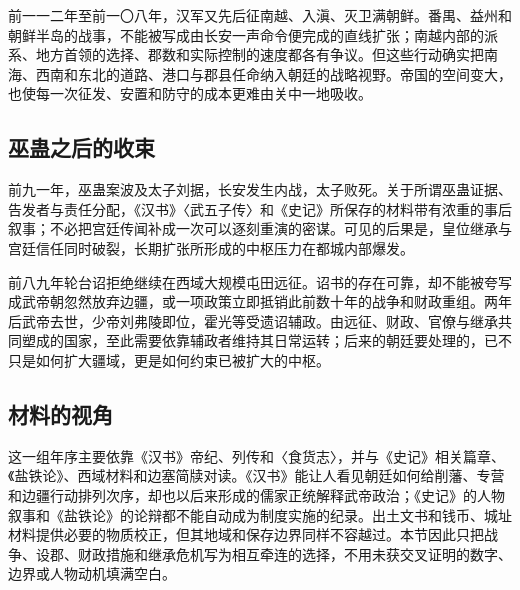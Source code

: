 前一一二年至前一〇八年，汉军又先后征南越、入滇、灭卫满朝鲜。番禺、益州和朝鲜半岛的战事，不能被写成由长安一声命令便完成的直线扩张；南越内部的派系、地方首领的选择、郡数和实际控制的速度都各有争议。但这些行动确实把南海、西南和东北的道路、港口与郡县任命纳入朝廷的战略视野。帝国的空间变大，也使每一次征发、安置和防守的成本更难由关中一地吸收。

\subsection{巫蛊之后的收束}

前九一年，巫蛊案波及太子刘据，长安发生内战，太子败死。关于所谓巫蛊证据、告发者与责任分配，《汉书》〈武五子传〉和《史记》所保存的材料带有浓重的事后叙事；不必把宫廷传闻补成一次可以逐刻重演的密谋。可见的后果是，皇位继承与宫廷信任同时破裂，长期扩张所形成的中枢压力在都城内部爆发。

前八九年轮台诏拒绝继续在西域大规模屯田远征。诏书的存在可靠，却不能被夸写成武帝朝忽然放弃边疆，或一项政策立即抵销此前数十年的战争和财政重组。两年后武帝去世，少帝刘弗陵即位，霍光等受遗诏辅政。由远征、财政、官僚与继承共同塑成的国家，至此需要依靠辅政者维持其日常运转；后来的朝廷要处理的，已不只是如何扩大疆域，更是如何约束已被扩大的中枢。

\subsection{材料的视角}

这一组年序主要依靠《汉书》帝纪、列传和〈食货志〉，并与《史记》相关篇章、《盐铁论》、西域材料和边塞简牍对读。《汉书》能让人看见朝廷如何给削藩、专营和边疆行动排列次序，却也以后来形成的儒家正统解释武帝政治；《史记》的人物叙事和《盐铁论》的论辩都不能自动成为制度实施的纪录。出土文书和钱币、城址材料提供必要的物质校正，但其地域和保存边界同样不容越过。本节因此只把战争、设郡、财政措施和继承危机写为相互牵连的选择，不用未获交叉证明的数字、边界或人物动机填满空白。
